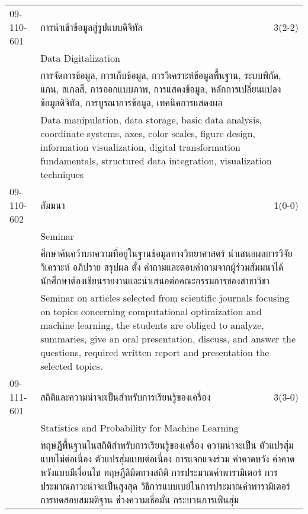 \begin{longtable}{p{}p{}r{}}
09-110-601 & การนำเข้าข้อมูลสู่รูปแบบดิจิทัล & 3(2-2)\\*
 & Data Digitalization & \phantom{x} \vspace{3mm} \\*
&  \multicolumn{2}{p{0.75\textwidth}}{การจัดการข้อมูล, การเก็บข้อมูล, การวิเคราะห์ข้อมูลพื้นฐาน, ระบบพิกัด, แกน, สเกลสี, การออกแบบภาพ, การแสดงข้อมูล, หลักการเปลี่ยนแปลงข้อมูลดิจิทัล, การบูรณาการข้อมูล, เทคนิคการแสดงผล} \vspace{3mm} \\*
&  \multicolumn{2}{p{0.75\textwidth}}{Data manipulation, data storage, basic data analysis, coordinate systems, axes, color scales, figure design, information visualization, digital transformation fundamentals, structured data integration, visualization techniques} \vspace{8mm} \\*
09-110-602 & สัมมนา & 1(0-0)\\*
 & Seminar & \phantom{x} \vspace{3mm} \\*
&  \multicolumn{2}{p{0.75\textwidth}}{ศึกษาค้นคว้าบทความที่อยู่ในฐานข้อมูลทางวิทยาศาสตร์ นำเสนอผลการวิจัย วิเคราะห์ อภิปราย สรุปผล ตั้ง คำถามและตอบคำถามจากผู้ร่วมสัมมนาได้ นักศึกษาต้องเขียนรายงานและนำเสนอต่อคณะกรรมการของสาขาวิชา} \vspace{3mm} \\*
&  \multicolumn{2}{p{0.75\textwidth}}{Seminar on articles selected from scientific journals focusing on topics concerning computational optimization and machine learning, the students are obliged to analyze, summaries, give an oral presentation, discuss, and answer the questions, required written report and presentation the selected topics.} \vspace{8mm} \\*
09-111-601 & สถิติและความน่าจะเป็นสำหรับการเรียนรู้ของเครื่อง & 3(3-0)\\*
 & Statistics and Probability for Machine Learning & \phantom{x} \vspace{3mm} \\*
&  \multicolumn{2}{p{0.75\textwidth}}{ทฤษฎีพื้นฐานในสถิติสำหรับการเรียนรู้ของเครื่อง ความน่าจะเป็น ตัวแปรสุ่มแบบไม่ต่อเนื่อง ตัวแปรสุ่มแบบต่อเนื่อง การแจกแจงร่วม ค่าคาดหวัง ค่าคาดหวังแบบมีเงื่อนไข ทฤษฎีลิมิตทางสถิติ การประมาณค่าพารามิเตอร์ การประมาณภาวะน่าจะเป็นสูงสุด วิธีการแบบเบย์ในการประมาณค่าพารามิเตอร์ การทดสอบสมมติฐาน ช่วงความเชื่อมั่น กระบวนการเฟ้นสุ่ม} \vspace{3mm} \\*

\end{longtable}
